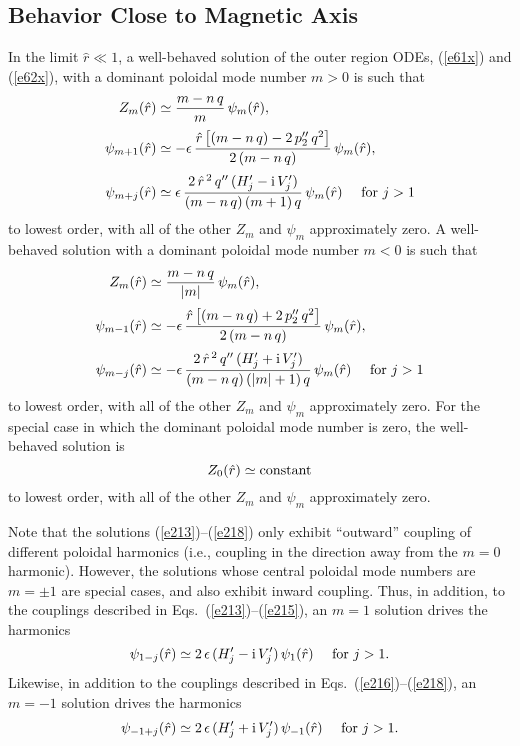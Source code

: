 \documentclass[12pt,prb,aps]{revtex4-1}
\begin{document}
\subsection{Behavior Close to Magnetic Axis}\label{axis}
In the limit $\hat{r}\ll 1$,  a well-behaved solution of the outer region ODEs, (\ref{e61x}) and (\ref{e62x}), with a dominant poloidal
mode number $m>0$ is such that\,\cite{am1}
\begin{align}\label{e213}
Z_m(\hat{r})&\simeq \frac{m-n\,q}{m}\,\psi_m(\hat{r}),\\[0.5ex]
\psi_{m+1}(\hat{r})&\simeq- \epsilon\,\frac{\hat{r}\left[(m-n\,q)-2\,p_2''\,q^2\right]}{2\,(m-n\,q)}\,\psi_m(\hat{r}),\\[0.5ex]
\psi_{m+j} (\hat{r})&\simeq 
\epsilon\,\frac{2\,\hat{r}^{\,2}\,q''\,(H_j'-{\rm i}\,V_j')}{(m-n\,q)\,(m+1)\,q}\,\psi_m(\hat{r})\mbox{~~~~for $j>1$}\label{e215}
\end{align}
to lowest order, with all of the other $Z_m$ and $\psi_m$ approximately zero. 
A well-behaved solution with a dominant poloidal mode number $m<0$ is such that 
\begin{align}
Z_m(\hat{r})&\simeq \frac{m-n\,q}{|m|}\,\psi_m(\hat{r}),\label{e216}\\[0.5ex]
\psi_{m-1}(\hat{r})&\simeq -\epsilon\,\frac{\hat{r}\left[(m-n\,q)+2\,p_2''\,q^2\right]}{2\,(m-n\,q)}\,\psi_m(\hat{r}),\\[0.5ex]
\psi_{m-j} (\hat{r})&\simeq 
-\epsilon\,\frac{2\,\hat{r}^{\,2}\,q''\,(H_j'+{\rm i}\,V_j')}{(m-n\,q)\,(|m|+1)\,q}\,\psi_m(\hat{r})\mbox{~~~~for $j>1$}\label{e218}
\end{align}
to lowest order, with all of the other $Z_m$ and $\psi_m$ approximately zero. For the special case in which the dominant poloidal
mode number is zero, the well-behaved solution is
\begin{equation}
Z_0(\hat{r})\simeq {\rm constant}
\end{equation}
to lowest order, with all of the other $Z_m$ and $\psi_m$ approximately zero. 

Note that the solutions (\ref{e213})--(\ref{e218}) only exhibit ``outward'' coupling of different poloidal harmonics
(i.e., coupling in the direction away from the $m=0$ harmonic). However, the solutions whose central poloidal
mode numbers are $m=\pm 1$ are special cases, and also exhibit inward coupling. Thus, in addition, to the
couplings described in Eqs.~(\ref{e213})--(\ref{e215}), an $m=1$ solution drives the harmonics
\begin{equation}
\psi_{1-j}(\hat{r})\simeq 2\,\epsilon\,(H_j'-{\rm i}\,V_j')\,\psi_1(\hat{r})\mbox{~~~~for $j>1$}.
\end{equation}
Likewise, in addition to the couplings described in Eqs.~(\ref{e216})--(\ref{e218}), an $m=-1$ solution drives the
harmonics
\begin{equation}
\psi_{-1+j}(\hat{r})\simeq 2\,\epsilon\,(H_j'+{\rm i}\,V_j')\,\psi_{-1}(\hat{r})\mbox{~~~~for $j>1$}.
\end{equation}
\end{document}

